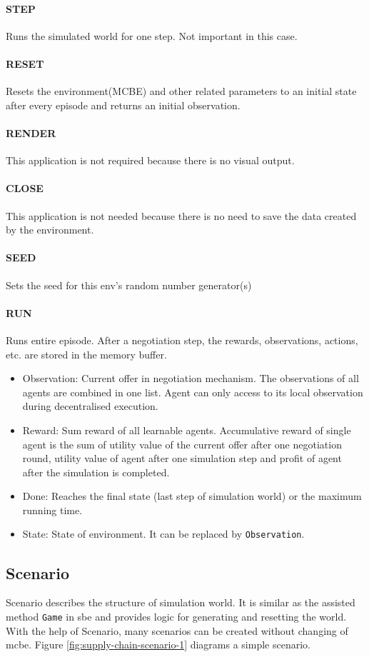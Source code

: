 \paragraph{STEP} Runs the simulated world for one step. Not important in this case. 
\paragraph{RESET} Resets the environment(MCBE) and other related parameters to an initial state after every episode and returns an initial observation.
\paragraph{RENDER} This application is not required because there is no visual output.
\paragraph{CLOSE} This application is not needed because there is no need to save the data created by
the environment.
\paragraph{SEED} Sets the seed for this env’s random number generator(s)
\paragraph{RUN} Runs entire episode. After a negotiation step, the rewards, observations, actions, etc. are stored in the memory buffer. 
\begin{itemize}
	\item Observation: Current offer in negotiation mechanism. The observations of all agents are combined in one list. Agent can only access to its local observation during decentralised execution.
	\item Reward: Sum reward of all learnable agents. Accumulative reward of single agent is the sum of utility value of the current offer after one negotiation round, utility value of agent after one simulation step and profit of agent after the simulation is completed.
	\item Done: Reaches the final state (last step of simulation world) or the maximum running time.
	\item State: State of environment. It can be replaced by \texttt{Observation}.
\end{itemize}

\subsection{Scenario} \label{scenario}
Scenario describes the structure of simulation world. It is similar as the assisted method \texttt{Game} in \gls{sbe} and provides logic for generating and resetting the world. With the help of Scenario, many scenarios can be created without changing of \gls{mcbe}. Figure \ref{fig:supply-chain-scenario-1} diagrams a simple scenario.

